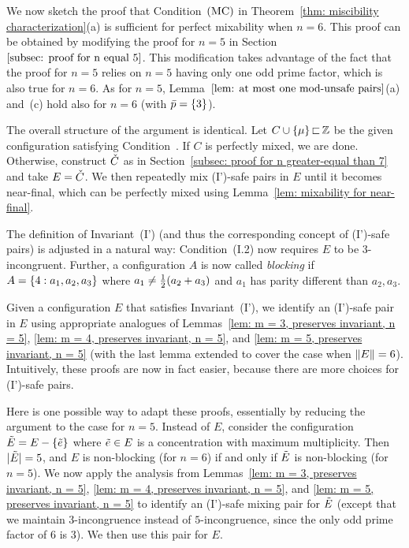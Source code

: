 


We now sketch the proof that Condition~${\textrm{(MC)}}$ in 
Theorem~\ref{thm: miscibility characterization}(a) is sufficient 
for perfect mixability when $n=6$. This proof can be obtained by
modifying the proof for $n=5$ in Section~$\ref{subsec: proof for n equal 5}$.
This modification takes advantage of the fact that the proof for $n=5$
relies on $n=5$ having only one odd prime factor, which is also true for $n=6$.
As for $n=5$, Lemma~$\ref{lem: at most one mod-unsafe pairs}$(a) and~(c)
hold also for $n=6$ (with ${\bar{p}} = { \left\{ 3 \right\} }$).

The overall structure of the argument is identical.
Let $C\cup { \left\{ \mu \right\} } {\,\sqsubset\,} {\mathbb Z}$ be the given configuration
satisfying Condition~{\MixCond}.
If $C$ is perfectly mixed, we are done.
Otherwise, construct ${\check{C}}$ as in Section~\ref{subsec: proof for n greater-equal than 7}
and take $E = {\check{C}}$. We then repeatedly mix (I')-safe pairs in $E$ until it becomes near-final,
which can be perfectly mixed using Lemma~\ref{lem: mixability for near-final}.

The definition of Invariant~(I') (and thus the corresponding concept of (I')-safe pairs) 
is adjusted in a natural way:
Condition~(I.2) now requires $E$ to be 3-incongruent.
Further, a configuration $A$ is now called \emph{blocking} if $A={ \left\{ 4:a_1,a_2,a_3 \right\} }$
where $a_1\neq{\textstyle\frac{1}{2}}(a_2+a_3)$ and $a_1$ has parity different than $a_2,a_3$.

Given a configuration $E$ that satisfies Invariant~(I'), we 
identify an (I')-safe pair in $E$ using appropriate analogues of 
Lemmas~\ref{lem: m = 3, preserves invariant, n = 5}, 
\ref{lem: m = 4, preserves invariant, n = 5},
and \ref{lem: m = 5, preserves invariant, n = 5} (with the last lemma extended to cover the
case when ${\|E\|} = 6$). Intuitively, these proofs are now in fact easier,
because there are more choices for (I')-safe pairs.

Here is one possible way to adapt these proofs, essentially by reducing the argument to the case
for $n=5$. Instead of $E$, consider the configuration ${\tilde{E}} = E -{ \left\{ {\tilde{e}} \right\} }$ 
where ${\tilde{e}}\in E$ is a concentration with maximum multiplicity. Then
${|{\tilde{E}}|}=5$, and $E$ is non-blocking (for $n=6$) if and only if ${\tilde{E}}$ is
non-blocking (for $n=5$).
We now apply the analysis from Lemmas~\ref{lem: m = 3, preserves invariant, n = 5}, 
\ref{lem: m = 4, preserves invariant, n = 5},
and \ref{lem: m = 5, preserves invariant, n = 5} to identify an (I')-safe mixing pair for ${\tilde{E}}$ 
(except that we maintain $3$-incongruence instead of $5$-incongruence,
since the only odd prime factor of $6$ is $3$). We then use this pair for $E$.

